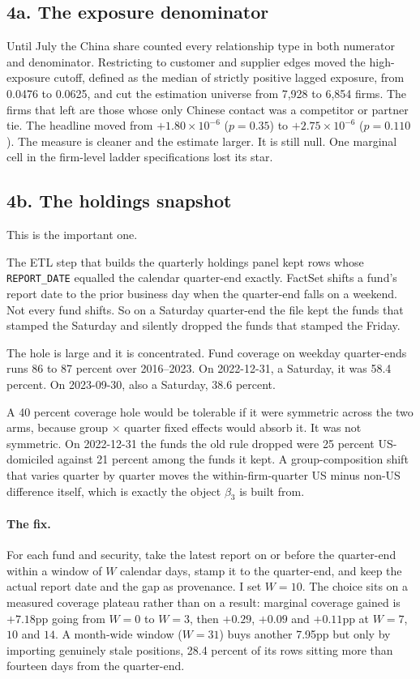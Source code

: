 \documentclass[11pt]{article}
\begin{document}
\subsection*{4a. The exposure denominator}

Until July the China share counted every relationship type in both numerator
and denominator. Restricting to customer and supplier edges moved the
high-exposure cutoff, defined as the median of strictly positive lagged
exposure, from 0.0476 to 0.0625, and cut the estimation universe from 7,928 to
6,854 firms. The firms that left are those whose only Chinese contact was a
competitor or partner tie. The headline moved from $+1.80 \times 10^{-6}$
($p = 0.35$) to $+2.75 \times 10^{-6}$ ($p = 0.110$). The measure is cleaner
and the estimate larger. It is still null. One marginal cell in the firm-level
ladder specifications lost its star.

\subsection*{4b. The holdings snapshot}

This is the important one.

The ETL step that builds the quarterly holdings panel kept rows whose
\texttt{REPORT\_DATE} equalled the calendar quarter-end exactly. FactSet
shifts a fund's report date to the prior business day when the quarter-end
falls on a weekend. Not every fund shifts. So on a Saturday quarter-end the
file kept the funds that stamped the Saturday and silently dropped the funds
that stamped the Friday.

The hole is large and it is concentrated. Fund coverage on weekday quarter-ends
runs 86 to 87 percent over 2016--2023. On 2022-12-31, a Saturday, it was
58.4 percent. On 2023-09-30, also a Saturday, 38.6 percent.

A 40 percent coverage hole would be tolerable if it were symmetric across the
two arms, because group $\times$ quarter fixed effects would absorb it. It was
not symmetric. On 2022-12-31 the funds the old rule dropped were 25 percent
US-domiciled against 21 percent among the funds it kept. A group-composition
shift that varies quarter by quarter moves the within-firm-quarter US minus
non-US difference itself, which is exactly the object $\beta_3$ is built from.

\paragraph{The fix.} For each fund and security, take the latest report on or
before the quarter-end within a window of $W$ calendar days, stamp it to the
quarter-end, and keep the actual report date and the gap as provenance. I set
$W = 10$. The choice sits on a measured coverage plateau rather than on a
result: marginal coverage gained is $+7.18$pp going from $W = 0$ to $W = 3$,
then $+0.29$, $+0.09$ and $+0.11$pp at $W = 7$, $10$ and $14$. A month-wide
window ($W = 31$) buys another 7.95pp but only by importing genuinely stale
positions, 28.4 percent of its rows sitting more than fourteen days from the
quarter-end.
\end{document}
